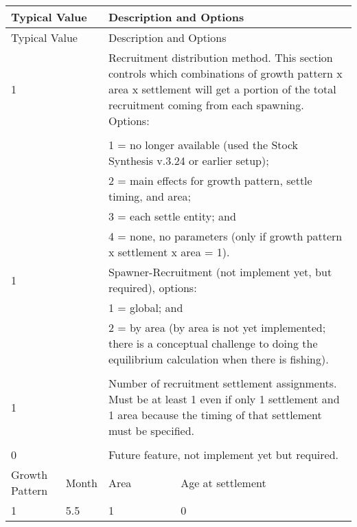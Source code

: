 \begin{center}
	\begin{longtable}{p{1.25cm} p{1.25cm} p{1cm} p{11.5cm}}
		\hline
		\multicolumn{2}{l}{Typical Value} & \multicolumn{2}{l}{Description and Options} \Tstrut\Bstrut\\
		\hline
		\endfirsthead
		
		\hline
		\multicolumn{2}{l}{Typical Value} & \multicolumn{2}{l}{Description and Options} \Tstrut\Bstrut\\
		\hline
		\endhead
		
		\hline
		\endfoot
		
		\endlastfoot
		
		1 & & \multicolumn{2}{l}{\parbox{12.5cm}{Recruitment distribution method. This section controls which combinations of growth pattern x area x settlement will get a portion of the total recruitment coming from each spawning. Options:}} \Tstrut\\
		& & \\
		& & \multicolumn{2}{l}{\parbox{12.5cm}{1 = no longer available (used the Stock Synthesis v.3.24 or earlier setup);}} \\
		& & \multicolumn{2}{l}{\parbox{12.5cm}{2 = main effects for growth pattern, settle timing, and area;}} \\
		& & \multicolumn{2}{l}{\parbox{12.5cm}{3 = each settle entity; and}} \\
		& & \multicolumn{2}{l}{\parbox{12.5cm}{4 = none, no parameters (only if growth pattern x settlement x area = 1).}} \Tstrut\Bstrut\\
		
		\hline
		1 & & \multicolumn{2}{l}{Spawner-Recruitment (not implement yet, but required), options:} \Tstrut\\
		& & \multicolumn{2}{l}{1 = global; and} \\
		& & \multicolumn{2}{l}{\parbox{12.5cm}{2 = by area (by area is not yet implemented; there is a conceptual challenge to doing the equilibrium calculation when there is fishing).}} \\
		& & \\
		
		\hline
		1 & & \multicolumn{2}{l}{\parbox{12.5cm}{Number of recruitment settlement assignments. Must be at least 1 even if only 1 settlement and 1 area because the timing of that settlement must be specified.}} \Tstrut\Bstrut\\ 
		& & \\
		
		\hline
		0 \Tstrut & & \multicolumn{2}{l}{Future feature, not implement yet but required.} \Bstrut\\
		
		\hline
		Growth Pattern & Month & Area & Age at settlement \Tstrut\\
		\hline
		1 & 5.5 & 1 & 0 \Bstrut\\
		\hline
	\end{longtable}
	\vspace*{-\baselineskip}
\end{center}


